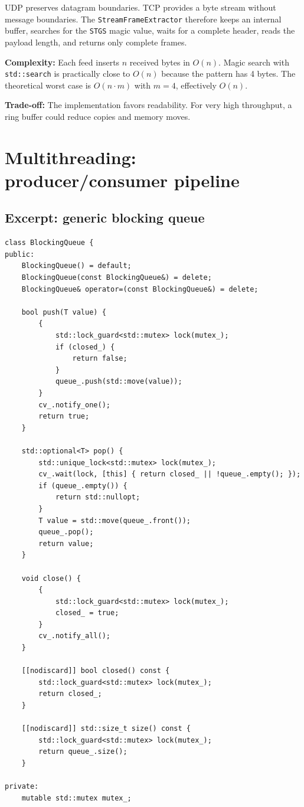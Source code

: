 \documentclass[10pt,a4paper]{article}
\newcommand{\complexity}[1]{\textbf{Complexity:} #1}
\newcommand{\tradeoff}[1]{\textbf{Trade-off:} #1}
\begin{document}
UDP preserves datagram boundaries. TCP provides a byte stream without message boundaries. The \texttt{StreamFrameExtractor} therefore keeps an internal buffer, searches for the \texttt{STGS} magic value, waits for a complete header, reads the payload length, and returns only complete frames.

\complexity{Each feed inserts $n$ received bytes in $O(n)$. Magic search with \texttt{std::search} is practically close to $O(n)$ because the pattern has 4 bytes. The theoretical worst case is $O(n \cdot m)$ with $m=4$, effectively $O(n)$.}

\tradeoff{The implementation favors readability. For very high throughput, a ring buffer could reduce copies and memory moves.}

\section{Multithreading: producer/consumer pipeline}

\subsection{Excerpt: generic blocking queue}
\begin{lstlisting}[caption={Thread-safe queue with explicit closure}]
class BlockingQueue {
public:
    BlockingQueue() = default;
    BlockingQueue(const BlockingQueue&) = delete;
    BlockingQueue& operator=(const BlockingQueue&) = delete;

    bool push(T value) {
        {
            std::lock_guard<std::mutex> lock(mutex_);
            if (closed_) {
                return false;
            }
            queue_.push(std::move(value));
        }
        cv_.notify_one();
        return true;
    }

    std::optional<T> pop() {
        std::unique_lock<std::mutex> lock(mutex_);
        cv_.wait(lock, [this] { return closed_ || !queue_.empty(); });
        if (queue_.empty()) {
            return std::nullopt;
        }
        T value = std::move(queue_.front());
        queue_.pop();
        return value;
    }

    void close() {
        {
            std::lock_guard<std::mutex> lock(mutex_);
            closed_ = true;
        }
        cv_.notify_all();
    }

    [[nodiscard]] bool closed() const {
        std::lock_guard<std::mutex> lock(mutex_);
        return closed_;
    }

    [[nodiscard]] std::size_t size() const {
        std::lock_guard<std::mutex> lock(mutex_);
        return queue_.size();
    }

private:
    mutable std::mutex mutex_;
\end{lstlisting}
\end{document}
